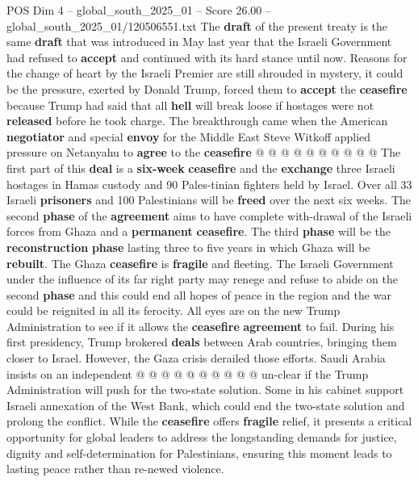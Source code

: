 \begin{textsample}{POS Dim 4 – global\_south\_2025\_01 – Score 26.00 – global\_south\_2025\_01/120506551.txt}
The \textbf{draft} of the present treaty is the same \textbf{draft} that was introduced in May last year that the Israeli Government had refused to \textbf{accept} and continued with its hard stance until now.
Reasons for the change of heart by the Israeli Premier are still shrouded in mystery, it could be the pressure, exerted by Donald Trump, forced them to \textbf{accept} the \textbf{ceasefire} because Trump had said that all \textbf{hell} will break loose if hostages were not \textbf{released} before he took charge.
The breakthrough came when the American \textbf{negotiator} and special \textbf{envoy} for the Middle East Steve Witkoff applied pressure on Netanyahu to \textbf{agree} to the \textbf{ceasefire} @ @ @ @ @ @ @ @ @ @ The first part of this \textbf{deal} is a \textbf{six-week} \textbf{ceasefire} and the \textbf{exchange} three Israeli hostages in Hamas custody and 90 Pales-tinian fighters held by Israel.
Over all 33 Israeli \textbf{prisoners} and 100 Palestinians will be \textbf{freed} over the next six weeks.
The second \textbf{phase} of the \textbf{agreement} aims to have complete with-drawal of the Israeli forces from Ghaza and a \textbf{permanent} \textbf{ceasefire}.
The third \textbf{phase} will be the \textbf{reconstruction} \textbf{phase} lasting three to five years in which Ghaza will be \textbf{rebuilt}.
The Ghaza \textbf{ceasefire} is \textbf{fragile} and fleeting.
The Israeli Government under the influence of its far right party may renege and refuse to abide on the second \textbf{phase} and this could end all hopes of peace in the region and the war could be reignited in all its ferocity.
All eyes are on the new Trump Administration to see if it allows the \textbf{ceasefire} \textbf{agreement} to fail.
During his first presidency, Trump brokered \textbf{deals} between Arab countries, bringing them closer to Israel.
However, the Gaza crisis derailed those efforts.
Saudi Arabia insists on an independent @ @ @ @ @ @ @ @ @ @ un-clear if the Trump Administration will push for the two-state solution.
Some in his cabinet support Israeli annexation of the West Bank, which could end the two-state solution and prolong the conflict.
While the \textbf{ceasefire} offers \textbf{fragile} relief, it presents a critical opportunity for global leaders to address the longstanding demands for justice, dignity and self-determination for Palestinians, ensuring this moment leads to lasting peace rather than re-newed violence.

\end{textsample}
